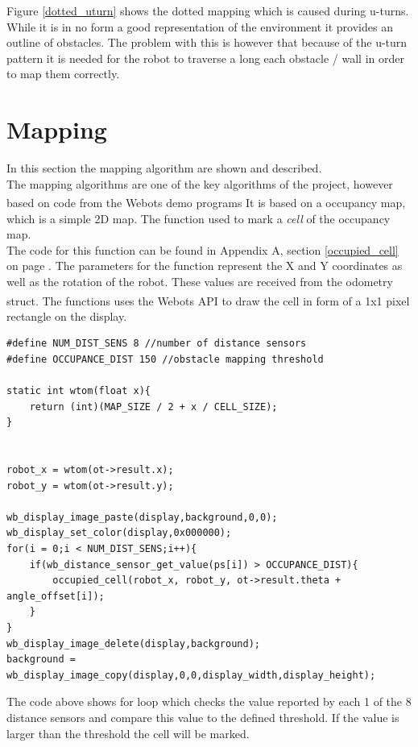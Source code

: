 Figure \ref{dotted_uturn} shows the dotted mapping which is caused during u-turns. While it is in no form a good representation of the environment it provides an outline of obstacles. The problem with this is however that because of the u-turn pattern it is needed for the robot to traverse a long each obstacle / wall in order to map them correctly. 

\section{Mapping}
In this section the mapping algorithm are shown and described. \\
The mapping algorithms are one of the key algorithms of the project, however based on code from the Webots\textsuperscript{\texttrademark} demo programs It is based on a occupancy map, which is a simple 2D map. The function used to mark a \textit{cell} of the occupancy map.\\
The code for this function can be found in Appendix A, section \ref{occupied_cell} on page \pageref{occupied_cell}.
The parameters for the function represent the X and Y coordinates as well as the rotation of the robot. These values are received from the odometry struct. 
The functions uses the Webots\textsuperscript{\texttrademark}  API to draw the cell in form of a 1x1 pixel rectangle on the display. 

\begin{lstlisting}[caption={obstacle detection and mapping}]
#define NUM_DIST_SENS 8 //number of distance sensors 
#define OCCUPANCE_DIST 150 //obstacle mapping threshold

static int wtom(float x){
	return (int)(MAP_SIZE / 2 + x / CELL_SIZE);
}


robot_x = wtom(ot->result.x);
robot_y = wtom(ot->result.y);

wb_display_image_paste(display,background,0,0);
wb_display_set_color(display,0x000000);
for(i = 0;i < NUM_DIST_SENS;i++){
	if(wb_distance_sensor_get_value(ps[i]) > OCCUPANCE_DIST){
		occupied_cell(robot_x, robot_y, ot->result.theta + angle_offset[i]);
	}
}
wb_display_image_delete(display,background);
background = wb_display_image_copy(display,0,0,display_width,display_height); 
\end{lstlisting}

The code above shows for loop which checks the value reported by each 1 of the 8 distance sensors and compare this value to the defined threshold. If the value is larger than the threshold the cell will be marked. 

